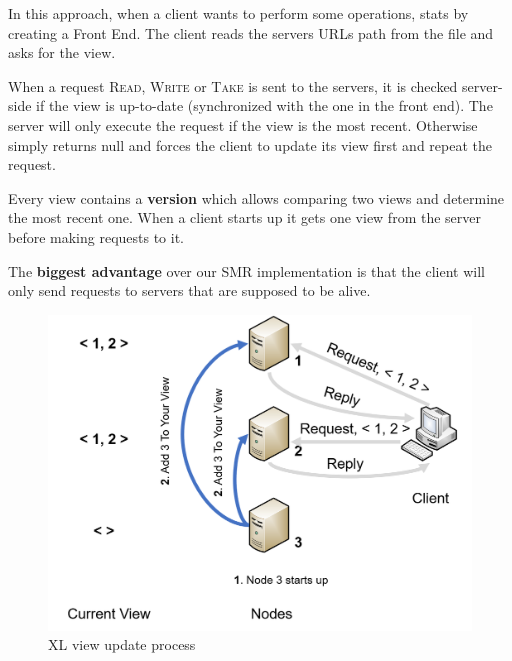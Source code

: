 \documentclass[times, 10pt,twocolumn]{article}
\begin{document}


In this approach, when a client wants to perform some operations, stats by creating
a Front End. The client reads the servers URLs path from the file and asks for
the view.

When a request \textsc{Read}, \textsc{Write} or \textsc{Take} is sent to the servers,
it is checked server-side if the view is up-to-date (synchronized with the one 
in the front end).
The server will only execute the request if the view is the most recent. Otherwise
simply returns null and forces the client to update its view first and repeat the
request.

Every view contains a \textbf{version} which allows comparing two views and determine the
most recent one. When a client starts up it gets one view from the server before
making requests to it.

The \textbf{biggest advantage} over our SMR implementation is that the client will only
send requests to servers that are supposed to be alive.

 


\begin{figure}
   \includegraphics[width=\linewidth]{xl_join1.png}
   \caption{XL view update process}
   \label{fig:xl_join1}
 \end{figure}
\end{document}
